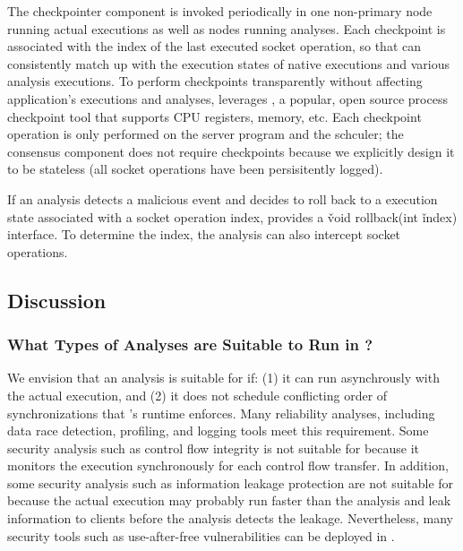 The checkpointer component is invoked periodically in one non-primary node 
running actual executions as well as nodes running analyses. Each 
checkpoint is associated with the index of the last executed socket operation, 
so that \xxx can consistently match up with the execution states of native 
executions and various analysis executions. To perform checkpoints 
transparently without affecting application's executions and analyses, \xxx 
leverages \criu, a popular, open source process checkpoint tool that supports 
CPU registers, memory, etc. Each checkpoint operation is only performed on the 
server program and the \dmt schculer; the \paxos consensus component does not 
require checkpoints because we explicitly design it to be stateless (all socket 
operations have been persisitently logged).

If an analysis detects a malicious event and decides to roll back to a 
execution state associated with a socket operation index, \xxx provides a 
\v{void rollback(int} \v{index)} interface. To determine the index, the 
analysis can also intercept socket operations.



\subsection{Discussion} \label{sec:discuss}

\subsubsection{What Types of Analyses are Suitable to Run in \xxx?} 
\label{sec:analysis-types}

We envision that an analysis is suitable for \xxx if: (1) it can run 
asynchrously with the actual execution, and (2) it does not schedule 
conflicting order of \pthread synchronizations that \xxx's \dmt runtime 
enforces. Many reliability analyses, including data race detection, profiling, 
and logging tools meet this requirement. Some security analysis such as control 
flow integrity is not suitable for \xxx because it monitors the execution 
synchronously for each control flow transfer. In addition, some security 
analysis such as information leakage protection are not suitable for \xxx 
because the actual execution may probably run faster than the 
analysis and leak information to clients before the analysis detects the 
leakage. Nevertheless, many security tools such as use-after-free 
vulnerabilities can be deployed in \xxx.

